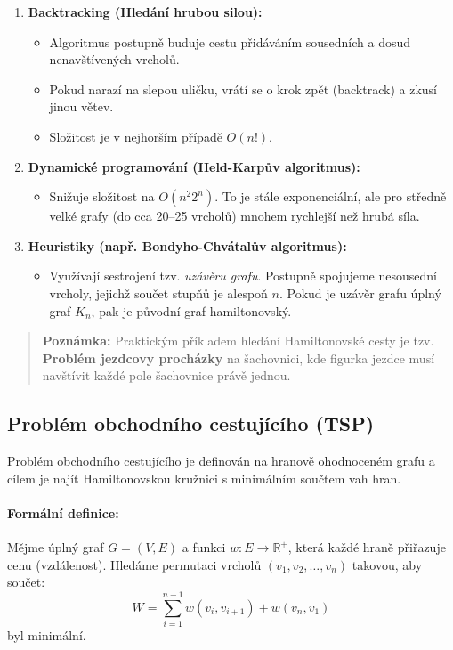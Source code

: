 \begin{enumerate}
    \item \textbf{Backtracking (Hledání hrubou silou):}
    \begin{itemize}
        \item Algoritmus postupně buduje cestu přidáváním sousedních a dosud nenavštívených vrcholů. 
        \item Pokud narazí na slepou uličku, vrátí se o krok zpět (backtrack) a zkusí jinou větev.
        \item Složitost je v nejhorším případě $O(n!)$.
    \end{itemize}
    
    \item \textbf{Dynamické programování (Held-Karpův algoritmus):}
    \begin{itemize}
        \item Snižuje složitost na $O(n^2 2^n)$. To je stále exponenciální, ale pro středně velké grafy (do cca 20–25 vrcholů) mnohem rychlejší než hrubá síla.
    \end{itemize}
    
    \item \textbf{Heuristiky (např. Bondyho-Chvátalův algoritmus):}
    \begin{itemize}
        \item Využívají sestrojení tzv. \textit{uzávěru grafu}. Postupně spojujeme nesousední vrcholy, jejichž součet stupňů je alespoň $n$. Pokud je uzávěr grafu úplný graf $K_n$, pak je původní graf hamiltonovský.
    \end{itemize}
\end{enumerate}

\begin{quote}
\textbf{Poznámka:} Praktickým příkladem hledání Hamiltonovské cesty je tzv. \textbf{Problém jezdcovy procházky} na šachovnici, kde figurka jezdce musí navštívit každé pole šachovnice právě jednou.
\end{quote}

\subsection{Problém obchodního cestujícího (TSP)}
Problém obchodního cestujícího je definován na hranově ohodnoceném grafu a cílem je najít Hamiltonovskou kružnici s minimálním součtem vah hran.

\paragraph*{Formální definice:}
Mějme úplný graf $G=(V, E)$ a funkci $w: E \to \mathbb{R}^+$, která každé hraně přiřazuje cenu (vzdálenost). Hledáme permutaci vrcholů $(v_1, v_2, \dots, v_n)$ takovou, aby součet:
\[ W = \sum_{i=1}^{n-1} w(v_i, v_{i+1}) + w(v_n, v_1) \]
byl minimální.

